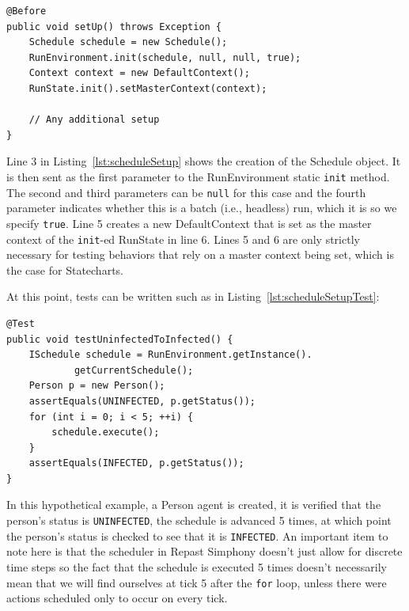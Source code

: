 \documentclass[11pt]{amsart}
\begin{document}
\noindent\begin{minipage}[h]{\textwidth}
\vspace{.2in}
\lstset{language=java,caption=@Before setup method in a schedule dependent test case.,label=lst:scheduleSetup}
\begin{lstlisting}
@Before
public void setUp() throws Exception {
	Schedule schedule = new Schedule();
	RunEnvironment.init(schedule, null, null, true);
	Context context = new DefaultContext();
	RunState.init().setMasterContext(context);
	
	// Any additional setup
}

\end{lstlisting}
\vspace{.2in}
\end{minipage}
Line 3 in Listing~\ref{lst:scheduleSetup} shows the creation of the Schedule object. It is then sent as the first parameter to the RunEnvironment static \texttt{init} method. The second and third parameters can be \texttt{null} for this case and the fourth parameter indicates whether this is a batch (i.e., headless) run, which it is so we specify \texttt{true}. Line 5 creates a new DefaultContext that is set as the master context of the \texttt{init}-ed RunState in line 6. Lines 5 and 6 are only strictly necessary for testing behaviors that rely on a master context being set, which is the case for Statecharts.

At this point, tests can be written such as in Listing~\ref{lst:scheduleSetupTest}:

\noindent\begin{minipage}[h]{\textwidth}
\vspace{.2in}
\lstset{language=java,caption=Example test method where the schedule is advanced.,label=lst:scheduleSetupTest}
\begin{lstlisting}
@Test
public void testUninfectedToInfected() {
	ISchedule schedule = RunEnvironment.getInstance().
			getCurrentSchedule();
	Person p = new Person();
	assertEquals(UNINFECTED, p.getStatus());
	for (int i = 0; i < 5; ++i) {
		schedule.execute();
	}
	assertEquals(INFECTED, p.getStatus());
}
\end{lstlisting}
\vspace{.2in}
\end{minipage}
In this hypothetical example, a Person agent is created, it is verified that the person's status is \texttt{UNINFECTED}, the schedule is advanced 5 times, at which point the person's status is checked to see that it is \texttt{INFECTED}. An important item to note here is that the scheduler in Repast Simphony doesn't just allow for discrete time steps so the fact that the schedule is executed 5 times doesn't necessarily mean that we will find ourselves at tick 5 after the \texttt{for} loop, unless there were actions scheduled only to occur on every tick.
\end{document}
